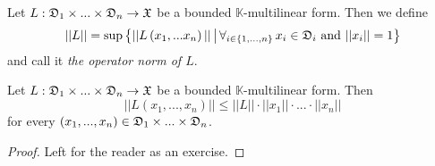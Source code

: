 \begin{definition}
Let $L:{\mathfrak D}_1\times ... \times {\mathfrak D}_n\rightarrow {\mathfrak X}$ be a bounded $\mathbb{K}$-multilinear form. Then we define
$$||L|| = \sup \big\{||L\left(x_1,...x_n\right)||\,\big|\,\forall_{i\in \{1,...,n\}}\,x_i\in {\mathfrak D}_i\mbox{ and }||x_i|| = 1 \big\}$$
and call it \textit{the operator norm of $L$}.
\end{definition}

\begin{fact}\label{fact:operator_norm_is_lipschitz_constant}
Let $L:{\mathfrak D}_1\times ... \times {\mathfrak D}_n\rightarrow {\mathfrak X}$ be a bounded $\mathbb{K}$-multilinear form. Then
$$||L(x_1,...,x_n)|| \leq ||L||\cdot ||x_1||\cdot ...\cdot ||x_n||$$
for every $(x_1,...,x_n) \in {\mathfrak D}_1\times ... \times {\mathfrak D}_n$.
\end{fact}
\begin{proof}
Left for the reader as an exercise.
\end{proof}

